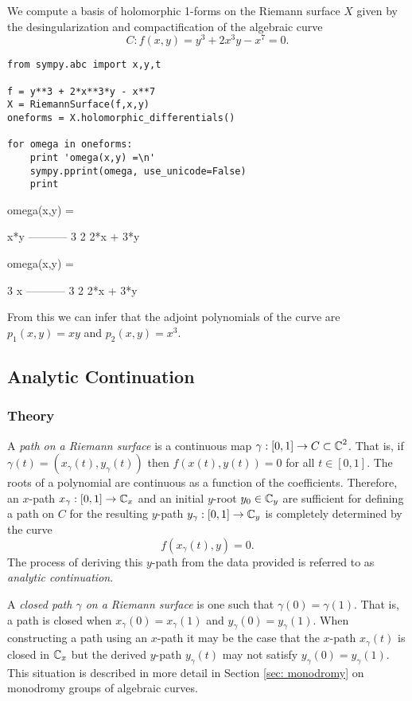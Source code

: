 We compute a basis of holomorphic 1-forms on the Riemann surface $X$
given by the desingularization and compactification of the algebraic
curve
\[
    C : f(x,y) = y^3 + 2x^3y - x^7 = 0.
\]
\begin{lstlisting}
from sympy.abc import x,y,t

f = y**3 + 2*x**3*y - x**7
X = RiemannSurface(f,x,y)
oneforms = X.holomorphic_differentials()

for omega in oneforms:
    print 'omega(x,y) =\n'
    sympy.pprint(omega, use_unicode=False)
    print
\end{lstlisting}
\begin{pyoutput}
omega(x,y) =

    x*y    
-----------
   3      2
2*x  + 3*y 

omega(x,y) =

      3    
     x     
-----------
   3      2
2*x  + 3*y
\end{pyoutput}
From this we can infer that the adjoint polynomials of the curve are
$p_1(x,y) = xy$ and $p_2(x,y) = x^3$.


\subsection{Analytic Continuation} \label{sec: analytic-continuation}

%
\subsubsection*{Theory}
%

A {\it path on a Riemann surface} is a continuous map $\gamma : [0,1]
\to C \subset \operatorname{\mathbb{C}}^2$. That is, if $\gamma(t) = (x_\gamma(t),
y_\gamma(t))$ then $f(x(t),y(t)) = 0$ for all $t \in [0,1]$. The roots
of a polynomial are continuous as a function of the
coefficients. Therefore, an $x$-path $x_\gamma : [0,1] \to \operatorname{\mathbb{C}}_x$ and an
initial $y$-root $y_0 \in \operatorname{\mathbb{C}}_y$ are sufficient for defining a path on
$C$ for the resulting $y$-path $y_\gamma : [0,1] \to \operatorname{\mathbb{C}}_y$ is
completely determined by the curve
\[
    f(x_\gamma(t),y) = 0.
\]
The process of deriving this $y$-path from the data provided is
referred to as {\it analytic continuation}.

A {\it closed path $\gamma$ on a Riemann surface} is one such that
$\gamma(0) = \gamma(1)$. That is, a path is closed when $x_\gamma(0) =
x_\gamma(1)$ and $y_\gamma(0) = y_\gamma(1)$. When constructing a path
using an $x$-path it may be the case that the $x$-path $x_\gamma(t)$ is
closed in $\operatorname{\mathbb{C}}_x$ but the derived $y$-path $y_\gamma(t)$ may not satisfy
$y_\gamma(0) = y_\gamma(1)$. This situation is described in more detail
in Section \ref{sec: monodromy} on monodromy groups of algebraic curves.

